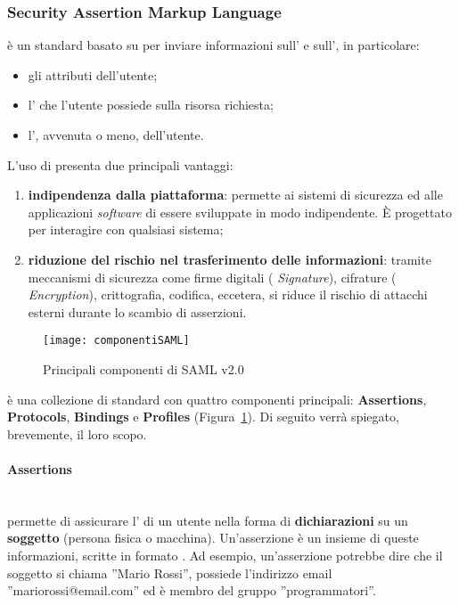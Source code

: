 \subsubsection{Security Assertion Markup Language}
 è un standard basato su  per inviare informazioni sull' e sull', in particolare:
\begin{itemize}
\item gli attributi dell'utente;
\item l' che l'utente possiede sulla risorsa richiesta;
\item l', avvenuta o meno, dell'utente.
\end{itemize}
L'uso di  presenta due principali vantaggi:
\begin{enumerate}
\item \textbf{indipendenza dalla piattaforma}: permette ai sistemi di sicurezza ed
alle applicazioni \textit{software} di essere sviluppate in modo indipendente. È progettato per interagire con qualsiasi sistema;
\item \textbf{riduzione del rischio nel trasferimento delle informazioni}: tramite meccanismi di sicurezza come firme digitali (\textit{ Signature}), cifrature (\textit{ Encryption}), crittografia, codifica, eccetera, si riduce il rischio di attacchi esterni durante lo
scambio di asserzioni.
\end{enumerate}

\begin{figure}[hbpc]
\begin{center}
\texttt{[image: componentiSAML]}
\caption[Principali componenti di SAML v2.0]{Principali componenti di SAML v2.0\protect\footnotemark}
\label{fig:componentiSAML}
\end{center}
\end{figure}

 è una collezione di standard con quattro componenti principali: \textbf{Assertions}, \textbf{Protocols}, \textbf{Bindings} e \textbf{Profiles} (Figura~\ref{fig:componentiSAML}). Di seguito verrà spiegato, brevemente, il loro scopo.

\paragraph{Assertions} \mbox{} \\
 permette di assicurare l' di un utente nella forma di \textbf{dichiarazioni} su un \textbf{soggetto} (persona fisica o macchina). Un'asserzione è un insieme di queste informazioni, scritte in formato . Ad esempio, un'asserzione potrebbe dire che il soggetto si chiama ''Mario Rossi'', possiede l'indirizzo email ''mariorossi@email.com'' ed è membro del gruppo ''programmatori''.


